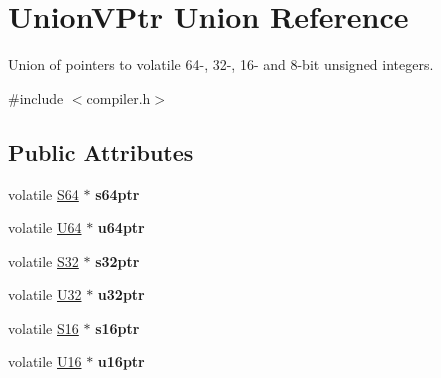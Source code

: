 \hypertarget{union_union_v_ptr}{\section{Union\-V\-Ptr Union Reference}
\label{union_union_v_ptr}
}


Union of pointers to volatile 64-\/, 32-\/, 16-\/ and 8-\/bit unsigned integers.  




{\ttfamily \#include $<$compiler.\-h$>$}

\subsection*{Public Attributes}
\begin{DoxyCompactItemize}
\item 
\hypertarget{union_union_v_ptr_acbf301cfdf3519e8240f785b15bcb07f}{volatile \hyperlink{group__group__xmega__utils_ga1d293e5c494dd6826239b02f5fe98e7f}{S64} $\ast$ {\bfseries s64ptr}}\label{union_union_v_ptr_acbf301cfdf3519e8240f785b15bcb07f}

\item 
\hypertarget{union_union_v_ptr_add94692ec8e633ed9efc32a0b4134a66}{volatile \hyperlink{group__group__xmega__utils_ga25809e0734a149248fcf5831efa4e33d}{U64} $\ast$ {\bfseries u64ptr}}\label{union_union_v_ptr_add94692ec8e633ed9efc32a0b4134a66}

\item 
\hypertarget{union_union_v_ptr_ad3980fc6efca2844b424b1c9bf17f935}{volatile \hyperlink{group__group__xmega__utils_ga39c786017723555afb9e8b85accec0de}{S32} $\ast$ {\bfseries s32ptr}}\label{union_union_v_ptr_ad3980fc6efca2844b424b1c9bf17f935}

\item 
\hypertarget{union_union_v_ptr_a90ba923b94ad85780d169572d3e346ff}{volatile \hyperlink{group__group__xmega__utils_ga696390429f2f3b644bde8d0322a24124}{U32} $\ast$ {\bfseries u32ptr}}\label{union_union_v_ptr_a90ba923b94ad85780d169572d3e346ff}

\item 
\hypertarget{union_union_v_ptr_a17051fdc2ec05cca756353562a8e1078}{volatile \hyperlink{group__group__xmega__utils_ga6d241ad21a823c90d4835380787db5d4}{S16} $\ast$ {\bfseries s16ptr}}\label{union_union_v_ptr_a17051fdc2ec05cca756353562a8e1078}

\item 
\hypertarget{union_union_v_ptr_aabd260d7853cf121cb44b0e04e8550ae}{volatile \hyperlink{group__group__xmega__utils_ga0a0a322d5fa4a546d293a77ba8b4a71f}{U16} $\ast$ {\bfseries u16ptr}}\label{union_union_v_ptr_aabd260d7853cf121cb44b0e04e8550ae}


\end{DoxyCompactItemize}
